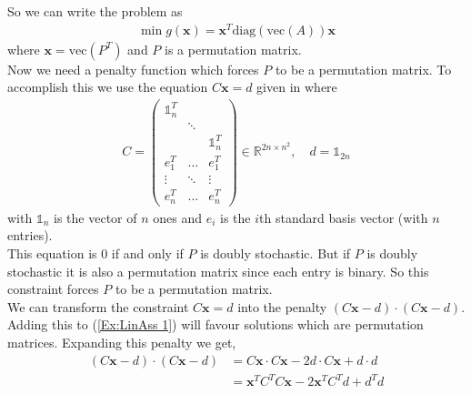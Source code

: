 \documentclass{article}
\begin{document}
\noindent So we can write the problem as 
\begin{align} \label{Ex:LinAss 1}
    \min g(\mathbf{x}) = \mathbf{x}^T \text{diag}(\text{vec}(A)) \mathbf{x}
\end{align}
where \(\mathbf{x} = \text{vec}(P^T)\) and \(P\) is a permutation matrix.\\

\noindent Now we need a penalty function which forces \(P\) to be a permutation matrix. To accomplish this we use the equation \(C\mathbf{x} = d\) given in \cite[p.~8]{klus2023continuous} where 
\begin{align}\label{mat:CD}
    C = \begin{pmatrix}
        \mathbb{1}_n^T & & \\
         & \ddots & \\ 
         & & \mathbb{1}_n^T \\
         e_1^T & \hdots & e_1^T \\
         \vdots & \ddots & \vdots \\
         e_n^T & \hdots & e_n^T
    \end{pmatrix} \in \mathbb{R}^{2n \times n^2}, \quad d = \mathbb{1}_{2n}
\end{align}
with \(\mathbb{1}_n\) is the vector of \(n\) ones and \(e_i\) is the \(i\)th standard basis vector (with \(n\) entries). \\

\noindent This equation is 0 if and only if \(P\) is doubly stochastic. But if \(P\) is doubly stochastic it is also a permutation matrix since each entry is binary. So this constraint forces \(P\) to be a permutation matrix.\\

\noindent We can transform the constraint \(C\mathbf{x} = d\) into the penalty \((C\mathbf{x} - d) \cdot (C\mathbf{x} - d)\). Adding this to (\ref{Ex:LinAss 1}) will favour solutions which are  permutation matrices.
Expanding this penalty we get,
\begin{align*}
    (C\mathbf{x} - d) \cdot (C\mathbf{x} - d) &= C\mathbf{x} \cdot C\mathbf{x} - 2d\cdot C\mathbf{x} + d \cdot d \\
    &= \mathbf{x}^T C^T C \mathbf{x} -2\mathbf{x}^T C^T d + d^Td
\end{align*}
\end{document}
